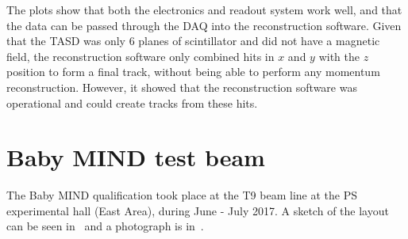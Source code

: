 

The plots show that both the electronics and readout system work well, and that the data can be passed through the DAQ into the reconstruction software. Given that the TASD was only 6 planes of scintillator and did not have a magnetic field, the reconstruction software only combined hits in $x$ and $y$ with the $z$ position to form a final track, without being able to perform any momentum reconstruction. However, it showed that the reconstruction software was operational and could create tracks from these hits.



\pagebreak
\section{Baby MIND test beam}

The Baby MIND qualification took place at the T9 beam line at the PS experimental hall (East Area), during June - July 2017. %
A sketch of the layout can be seen in~ and a photograph is in~.

